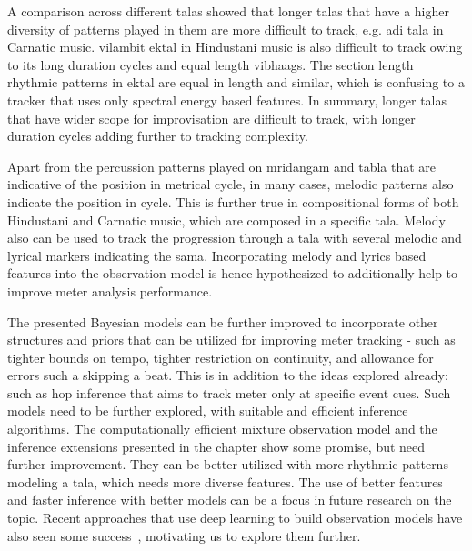A comparison across different \glspl{tala} showed that longer \glspl{tala} that have a higher diversity of patterns played in them are more difficult to track, e.g. \gls{adi} \gls{tala} in Carnatic music. \Gls{vilambit} \gls{ektal} in Hindustani music is also difficult to track owing to its long duration cycles and equal length \glspl{vibhaag}. The section length rhythmic patterns in \gls{ektal} are equal in length and similar, which is confusing to a tracker that uses only spectral energy based features. In summary, longer \glspl{tala} that have wider scope for improvisation are difficult to track, with longer duration cycles adding further to tracking complexity. 

Apart from the percussion patterns played on mridangam and \gls{tabla} that are indicative of the position in metrical cycle, in many cases, melodic patterns also indicate the position in cycle. This is further true in compositional forms of both Hindustani and Carnatic music, which are composed in a specific \gls{tala}. Melody also can be used to track the progression through a \gls{tala} with several melodic and lyrical markers indicating the \gls{sama}. Incorporating melody and lyrics based features into the observation model is hence hypothesized to additionally help to improve meter analysis performance. 

The presented Bayesian models can be further improved to incorporate other structures and priors that can be utilized for improving meter tracking - such as tighter bounds on tempo, tighter restriction on continuity, and allowance for errors such a skipping a beat. This is in addition to the ideas explored already: such as hop inference that aims to track meter only at specific event cues. Such models need to be further explored, with suitable and efficient inference algorithms. The computationally efficient mixture observation model and the inference extensions presented in the chapter show some promise, but need further improvement. They can be better utilized with more rhythmic patterns modeling a \gls{tala}, which needs more diverse features. The use of better features and faster inference with better models can be a focus in future research on the topic. Recent approaches that use deep learning to build observation models have also seen some success~\cite{bock:11:nnbeat}, motivating us to explore them further. 

